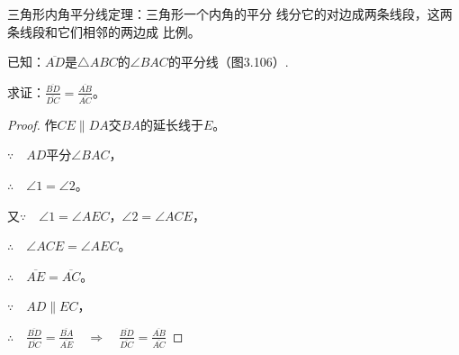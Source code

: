 \begin{figure}
    \begin{minipage}[t]{0.48\linewidth}
    \centering
  \begin{tikzpicture}[>=latex, scale=1]

    \end{tikzpicture}
    \caption{}
    \end{minipage}
    \begin{minipage}[t]{0.48\linewidth}
    \centering
    \begin{tikzpicture}[>=latex, scale=.8]


    \end{tikzpicture}
    \caption{}
    \end{minipage}
    \end{figure}

\begin{example}
    三角形内角平分线定理：三角形一个内角的平分
线分它的对边成两条线段，这两条线段和它们相邻的两边成
比例。

已知：$\overline{AD}$是$\triangle ABC$的$\angle BAC$的平分线（图3.106）.

求证：$\frac{\overline{BD}}{\overline{DC}}=\frac{\overline{AB}}{\overline{AC}}$。
\end{example}

\begin{proof}
作$CE\parallel DA$交$BA$的延长线于$E$。

$\because\quad AD$平分$\angle BAC$，

$\therefore\quad \angle 1=\angle 2$。

又$\because\quad \angle 1=\angle AEC$，$\angle 2=\angle ACE$，

$\therefore\quad \angle ACE=\angle AEC$。

$\therefore\quad \overline{AE}=\overline{AC}$。

$\because\quad AD\parallel EC$，

$\therefore\quad \frac{\overline{BD}}{\overline{DC}}=\frac{\overline{BA}}{\overline{AE}}\quad \Rightarrow \quad \frac{\overline{BD}}{\overline{DC}}=\frac{\overline{AB}}{\overline{AC}}$
\end{proof}

